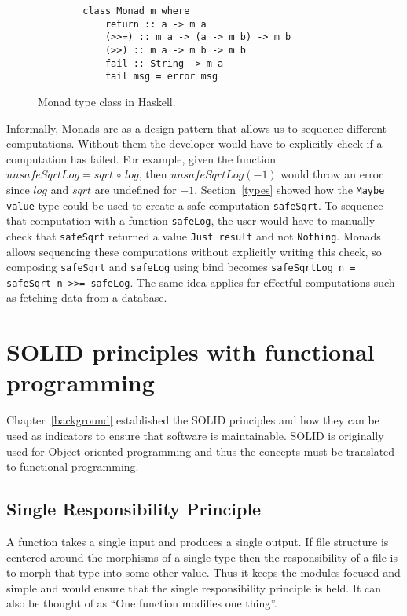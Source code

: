 \begin{figure}[H]
    \begin{lstlisting}
        class Monad m where  
            return :: a -> m a  
            (>>=) :: m a -> (a -> m b) -> m b  
            (>>) :: m a -> m b -> m b  
            fail :: String -> m a  
            fail msg = error msg 
    \end{lstlisting}
    \caption{Monad type class in Haskell.}
    \label{monadclass}
\end{figure}

Informally, Monads are as a design pattern that allows us to sequence different
computations. Without them the developer would have to explicitly check if a
computation has failed. For example, given the function $unsafeSqrtLog =
sqrt\,\circ\,log$, then $unsafeSqrtLog(-1)$ would throw an error since $log$ and
$sqrt$ are undefined for $-1$.  Section~\ref{types} showed how the \texttt{Maybe
value} type could be used to create a safe computation \texttt{safeSqrt}.  To
sequence that computation with a function \texttt{safeLog}, the user would have
to manually check that \texttt{safeSqrt} returned a value \texttt{Just result}
and not \texttt{Nothing}. Monads allows sequencing these computations without
explicitly writing this check, so composing \texttt{safeSqrt} and
\texttt{safeLog} using bind becomes \texttt{safeSqrtLog n = safeSqrt n >>=
safeLog}. The same idea applies for effectful computations such as fetching data
from a database.

\section{SOLID principles with functional programming}\label{dependencyinjection}

Chapter~\ref{background} established the SOLID principles and how they can be
used as indicators to ensure that software is maintainable. SOLID is originally
used for Object-oriented programming and thus the concepts must be translated to
functional programming.

\subsection{Single Responsibility Principle}

A function takes a single input and produces a single output. If file structure
is centered around the morphisms of a single type then the responsibility of a
file is to morph that type into some other value. Thus it keeps the modules
focused and simple and would ensure that the single responsibility principle is
held. It can also be thought of as ``One function modifies one thing''.

